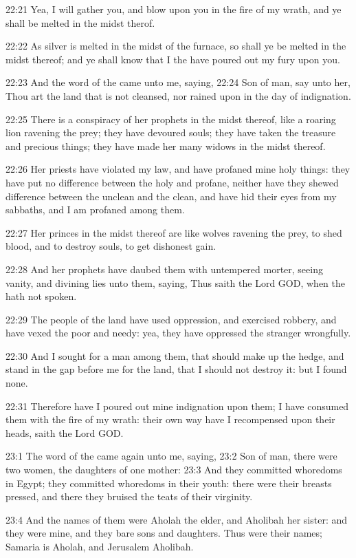 22:21 Yea, I will gather you, and blow upon you in the fire of my wrath, and ye shall be melted in the midst therof.

22:22 As silver is melted in the midst of the furnace, so shall ye be melted in the midst thereof; and ye shall know that I the \LORD have poured out my fury upon you.

22:23 And the word of the \LORD came unto me, saying, 22:24 Son of man, say unto her, Thou art the land that is not cleansed, nor rained upon in the day of indignation.

22:25 There is a conspiracy of her prophets in the midst thereof, like a roaring lion ravening the prey; they have devoured souls; they have taken the treasure and precious things; they have made her many widows in the midst thereof.

22:26 Her priests have violated my law, and have profaned mine holy things: they have put no difference between the holy and profane, neither have they shewed difference between the unclean and the clean, and have hid their eyes from my sabbaths, and I am profaned among them.

22:27 Her princes in the midst thereof are like wolves ravening the prey, to shed blood, and to destroy souls, to get dishonest gain.

22:28 And her prophets have daubed them with untempered morter, seeing vanity, and divining lies unto them, saying, Thus saith the Lord GOD, when the \LORD hath not spoken.

22:29 The people of the land have used oppression, and exercised robbery, and have vexed the poor and needy: yea, they have oppressed the stranger wrongfully.

22:30 And I sought for a man among them, that should make up the hedge, and stand in the gap before me for the land, that I should not destroy it: but I found none.

22:31 Therefore have I poured out mine indignation upon them; I have consumed them with the fire of my wrath: their own way have I recompensed upon their heads, saith the Lord GOD.

23:1 The word of the \LORD came again unto me, saying, 23:2 Son of man, there were two women, the daughters of one mother: 23:3 And they committed whoredoms in Egypt; they committed whoredoms in their youth: there were their breasts pressed, and there they bruised the teats of their virginity.

23:4 And the names of them were Aholah the elder, and Aholibah her sister: and they were mine, and they bare sons and daughters. Thus were their names; Samaria is Aholah, and Jerusalem Aholibah.

